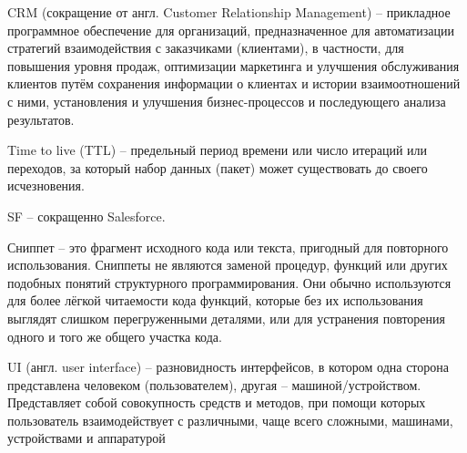 \label{sec:abbreviations:list}

CRM (сокращение от англ. Customer Relationship Management) -- прикладное программное обеспечение для организаций, предназначенное для автоматизации стратегий взаимодействия с заказчиками (клиентами), в частности, для повышения уровня продаж, оптимизации маркетинга и улучшения обслуживания клиентов путём сохранения информации о клиентах и истории взаимоотношений с ними, установления и улучшения бизнес-процессов и последующего анализа результатов.

Time to live (TTL) -- предельный период времени или число итераций или переходов, за который набор данных (пакет) может существовать до своего исчезновения.

SF -- сокращенно Salesforce.

Сниппет -- это фрагмент исходного кода или текста, пригодный для повторного использования. Сниппеты не являются заменой процедур, функций или других подобных понятий структурного программирования. Они обычно используются для более лёгкой читаемости кода функций, которые без их использования выглядят слишком перегруженными деталями, или для устранения повторения одного и того же общего участка кода.

UI (англ. user interface) -- разновидность интерфейсов, в котором одна сторона представлена человеком (пользователем), другая -- машиной/устройством. Представляет собой совокупность средств и методов, при помощи которых пользователь взаимодействует с различными, чаще всего сложными, машинами, устройствами и аппаратурой